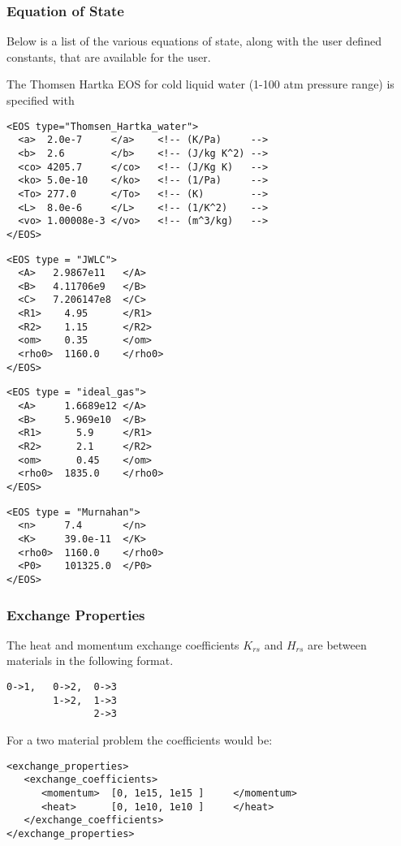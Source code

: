 \subsubsection{Equation of State}
Below is a list of the various equations of state, along with the user defined constants, that are available for the user.


The Thomsen Hartka EOS for cold liquid water (1-100 atm pressure range)
is specified with \cite{ref:Thomsen,ref:bejan}
\footnotesize
\begin{verbatim}
<EOS type="Thomsen_Hartka_water">
  <a>  2.0e-7     </a>    <!-- (K/Pa)     -->    
  <b>  2.6        </b>    <!-- (J/kg K^2) -->
  <co> 4205.7     </co>   <!-- (J/Kg K)   -->
  <ko> 5.0e-10    </ko>   <!-- (1/Pa)     -->
  <To> 277.0      </To>   <!-- (K)        -->
  <L>  8.0e-6     </L>    <!-- (1/K^2)    -->
  <vo> 1.00008e-3 </vo>   <!-- (m^3/kg)   -->
</EOS>
\end{verbatim}

\begin{verbatim}
<EOS type = "JWLC">
  <A>   2.9867e11   </A>
  <B>   4.11706e9   </B>
  <C>   7.206147e8  </C>
  <R1>    4.95      </R1>
  <R2>    1.15      </R2>
  <om>    0.35      </om>
  <rho0>  1160.0    </rho0>
</EOS>
\end{verbatim}
\begin{verbatim}
<EOS type = "ideal_gas">
  <A>     1.6689e12 </A>
  <B>     5.969e10  </B>
  <R1>      5.9     </R1>
  <R2>      2.1     </R2>
  <om>      0.45    </om>
  <rho0>  1835.0    </rho0>
</EOS>
\end{verbatim}
\normalfont

\begin{verbatim}
<EOS type = "Murnahan">
  <n>     7.4       </n>
  <K>     39.0e-11  </K>
  <rho0>  1160.0    </rho0>
  <P0>    101325.0  </P0>
</EOS>
\end{verbatim}
\normalfont

\subsubsection{Exchange Properties}
The heat and momentum exchange coefficients $K_{rs}$ and $H_{rs}$ are 
between materials in the following format.
\footnotesize
\begin{verbatim}
0->1,   0->2,  0->3
        1->2,  1->3
               2->3
\end{verbatim}
For a two material problem the coefficients would be:
\footnotesize
\begin{verbatim}
<exchange_properties> 
   <exchange_coefficients>
      <momentum>  [0, 1e15, 1e15 ]     </momentum>
      <heat>      [0, 1e10, 1e10 ]     </heat>  
   </exchange_coefficients>
</exchange_properties>
\end{verbatim}
\normalfont

